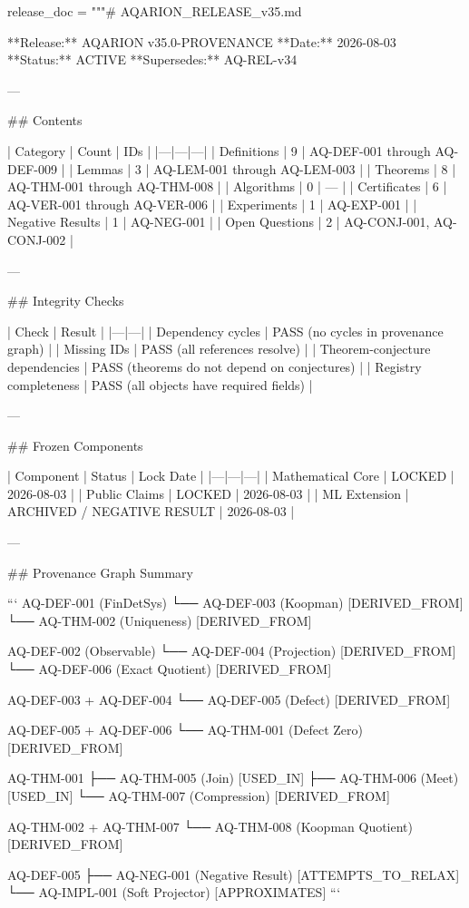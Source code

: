 release_doc = """# AQARION_RELEASE_v35.md

**Release:** AQARION v35.0-PROVENANCE
**Date:** 2026-08-03
**Status:** ACTIVE
**Supersedes:** AQ-REL-v34

---

## Contents

| Category | Count | IDs |
|---|---|---|
| Definitions | 9 | AQ-DEF-001 through AQ-DEF-009 |
| Lemmas | 3 | AQ-LEM-001 through AQ-LEM-003 |
| Theorems | 8 | AQ-THM-001 through AQ-THM-008 |
| Algorithms | 0 | — |
| Certificates | 6 | AQ-VER-001 through AQ-VER-006 |
| Experiments | 1 | AQ-EXP-001 |
| Negative Results | 1 | AQ-NEG-001 |
| Open Questions | 2 | AQ-CONJ-001, AQ-CONJ-002 |

---

## Integrity Checks

| Check | Result |
|---|---|
| Dependency cycles | PASS (no cycles in provenance graph) |
| Missing IDs | PASS (all references resolve) |
| Theorem-conjecture dependencies | PASS (theorems do not depend on conjectures) |
| Registry completeness | PASS (all objects have required fields) |

---

## Frozen Components

| Component | Status | Lock Date |
|---|---|---|
| Mathematical Core | LOCKED | 2026-08-03 |
| Public Claims | LOCKED | 2026-08-03 |
| ML Extension | ARCHIVED / NEGATIVE RESULT | 2026-08-03 |

---

## Provenance Graph Summary

```
AQ-DEF-001 (FinDetSys)
  └── AQ-DEF-003 (Koopman) [DERIVED_FROM]
  └── AQ-THM-002 (Uniqueness) [DERIVED_FROM]

AQ-DEF-002 (Observable)
  └── AQ-DEF-004 (Projection) [DERIVED_FROM]
  └── AQ-DEF-006 (Exact Quotient) [DERIVED_FROM]

AQ-DEF-003 + AQ-DEF-004
  └── AQ-DEF-005 (Defect) [DERIVED_FROM]

AQ-DEF-005 + AQ-DEF-006
  └── AQ-THM-001 (Defect Zero) [DERIVED_FROM]

AQ-THM-001
  ├── AQ-THM-005 (Join) [USED_IN]
  ├── AQ-THM-006 (Meet) [USED_IN]
  └── AQ-THM-007 (Compression) [DERIVED_FROM]

AQ-THM-002 + AQ-THM-007
  └── AQ-THM-008 (Koopman Quotient) [DERIVED_FROM]

AQ-DEF-005
  ├── AQ-NEG-001 (Negative Result) [ATTEMPTS_TO_RELAX]
  └── AQ-IMPL-001 (Soft Projector) [APPROXIMATES]
```

